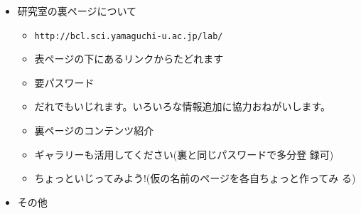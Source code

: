 \documentclass[twocolumn,11pt]{jsarticle}
\begin{document}
\begin{itemize}
\item 研究室の裏ページについて
  \begin{itemize}
  \item \verb|http://bcl.sci.yamaguchi-u.ac.jp/lab/|
  \item 表ページの下にあるリンクからたどれます
  \item 要パスワード
  \item だれでもいじれます。いろいろな情報追加に協力おねがいします。
  \item 裏ページのコンテンツ紹介
  \item ギャラリーも活用してください(裏と同じパスワードで多分登
    録可)
  \item ちょっといじってみよう!(仮の名前のページを各自ちょっと作ってみ
  る)
  \end{itemize}
\item その他
\end{itemize}
  
\end{document}
